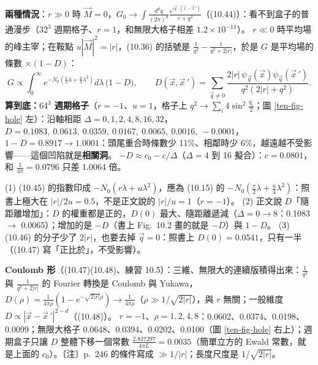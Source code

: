 \textbf{兩種情況}：$r\gg0$ 時 $\vec M=0$，$G_0\to\int\frac{d^dq}{(2\pi)^d}\frac{e^{i\vec q\cdot(\vec x-\vec x\,')}}{r+q^2}$（(10.44)）：看不到盒子的普通漫步（$32^3$ 週期格子、$r=1$，和無限大格子相差 $1.2\times10^{-11}$）。
$r\ll0$ 時平均場的峰主宰；在鞍點 $u|\vec M|^2=|r|$，(10.36) 的括號是 $\frac1{q^2}-\frac1{q^2+2|r|}$，於是 $G$ 是平均場的條數 $\times(1-D)$：
\[G\propto\int_0^\infty e^{-N_0(\frac r2\lambda+\frac u4\lambda^2)}d\lambda\,\big(1-D\big),\qquad D(\vec x,\vec x\,')=\sum_{\vec q\ne0}\frac{2|r|\,\psi_{\vec q}(\vec x)\psi_{\vec q}(\vec x\,')}{q^2(2|r|+q^2)} .\tag{10.45, 10.46}\]
\textbf{算到底：$64^3$ 週期格子}（$r=-1$、$u=1$，格子上 $q^2\to\sum_i4\sin^2\frac{q_i}2$；圖 \ref{ten-fig-hole} 左）：沿軸相距 $\Delta=0,1,2,4,\allowbreak8,16,32$，
$D=0.1083,\allowbreak\ 0.0613,\allowbreak\ 0.0359,\allowbreak\ 0.0167,\allowbreak\ 0.0065,\allowbreak\ 0.0016,\allowbreak\ -0.0001$，$1-D=0.8917\to1.0001$：頭尾重合時條數少 11\%、相鄰時少 6\%，越遠越不受影響——這個凹陷就是\textbf{相關洞}。
$-D\approx c_0-c/\Delta$（$\Delta=4$ 到 16 擬合）：$c=0.0801$，和 $\frac1{4\pi}=0.0796$ 只差 1.0064 倍。
\begin{errbox}[p.~245，(10.45)(10.46) 與正文]
(1) (10.45) 的指數印成 $-N_0(r\lambda+u\lambda^2)$，應為 (10.15) 的 $-N_0(\frac r2\lambda+\frac u4\lambda^2)$：照書上極大在 $|r|/2u=0.5$，不是正文說的 $|r|/u=1$（$r=-1$）。
(2) 正文說 $D$「隨距離增加」：$D$ 的權重都是正的，$D(0)$ 最大、隨距離遞減（$\Delta=0\to8$：0.1083 $\to$ 0.0065）；增加的是 $-D$（書上 Fig.~10.2 畫的就是 $-D$）與 $1-D$。
(3) (10.46) 的分子少了 $2|r|$，也要去掉 $\vec q=0$：照書上 $D(0)=0.0541$，只有一半（(10.47) 寫「正比於」，不受影響）。
\end{errbox}

\textbf{Coulomb 形}（(10.47)(10.48)、練習 10.5）：三維、無限大的連續版積得出來：$\frac1{q^2}$ 與 $\frac1{q^2+2|r|}$ 的 Fourier 轉換是 Coulomb 與 Yukawa，
$D(\rho)=\frac1{4\pi\rho}(1-e^{-\sqrt{2|r|}\rho})\to\frac1{4\pi\rho}$（$\rho\gg1/\sqrt{2|r|}$），與 $r$ 無關；一般維度 $D\propto|\vec x-\vec x\,'|^{2-d}$（(10.48)）。
$r=-1$、$\rho=1,2,4,8$：0.0602、0.0374、0.0198、0.0099；無限大格子 0.0648、0.0394、0.0202、0.0100（圖 \ref{ten-fig-hole} 右上）；週期盒子只讓 $D$ 整體下移一個常數
$\frac{2.837297}{4\pi L}=0.0035$（簡單立方的 Ewald 常數，就是上面的 $c_0$）。〔注〕p.~246 的條件寫成 $\gg1/|r|$；長度尺度是 $1/\sqrt{2|r|}$。

